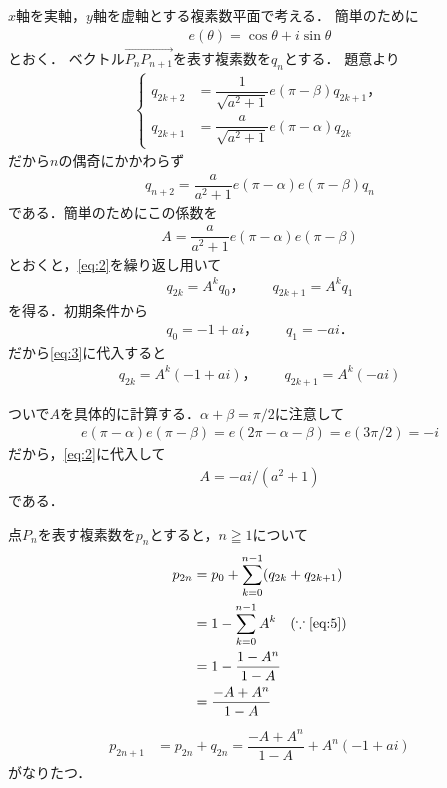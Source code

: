 \documentclass[../main.tex]{subfiles}
\begin{document}
$x$軸を実軸，$y$軸を虚軸とする複素数平面で考える．
簡単のために
\begin{align}
  e(\theta)=\cos\theta+i\sin\theta
\end{align}
とおく．
ベクトル$\overrightarrow{P_nP_{n+1}}$を表す複素数を$q_n$とする．
題意より
\begin{align}
  \begin{cases}
    q_{2k+2}&=\dfrac{1}{\sqrt{a^2+1}}e(\pi-\beta)q_{2k+1}，\\
    q_{2k+1}&=\dfrac{a}{\sqrt{a^2+1}}e(\pi-\alpha)q_{2k}
  \end{cases} \label{eq:1}
\end{align}
だから$n$の偶奇にかかわらず
\begin{align}
  q_{n+2}=\dfrac{a}{a^2+1}e(\pi-\alpha)e(\pi-\beta)q_n \label{eq:2}
\end{align}
である．簡単のためにこの係数を
\begin{align}
  A=\dfrac{a}{a^2+1}e(\pi-\alpha)e(\pi-\beta) \label{eq:A-definition}
\end{align}
とおくと，\cref{eq:2}を繰り返し用いて
\begin{align}
  q_{2k}=A^kq_0，\qquad q_{2k+1}=A^kq_1 \label{eq:3}
\end{align}
を得る．初期条件から
\begin{align}
  q_0=-1+ai，\qquad q_1=-ai． \label{eq:4}
\end{align}
だから\cref{eq:3}に代入すると
\begin{align}
  q_{2k}=A^k(-1+ai)，\qquad q_{2k+1}=A^k(-ai) \label{eq:5}
\end{align}

ついで$A$を具体的に計算する．$\alpha+\beta=\pi/2$に注意して
\begin{align}
  e(\pi-\alpha)e(\pi-\beta)
  =e(2\pi-\alpha-\beta)=e(3\pi/2)=-i
\end{align}
だから，\cref{eq:2}に代入して
\begin{align}
  A=-ai/(a^2+1) \label{eq:6}
\end{align}
である．

点$P_n$を表す複素数を$p_n$とすると，$n\geqq1$について
\begin{align}
  p_{2n}
  &=p_0+\sum_{k=0}^{n-1}(q_{2k}+q_{2k+1})\\
  &=1-\sum_{k=0}^{n-1}A^k \quad (\because \text{\cref{eq:5}}) \\
  &=1-\dfrac{1-A^n}{1-A} \\
  &=\dfrac{-A+A^n}{1-A} \label{eq:7}
\end{align}
\begin{align}
  p_{2n+1}
  &=p_{2n}+q_{2n}
  =\dfrac{-A+A^n}{1-A}+A^n(-1+ai) \label{eq:8}
\end{align}
がなりたつ．
\end{document}
